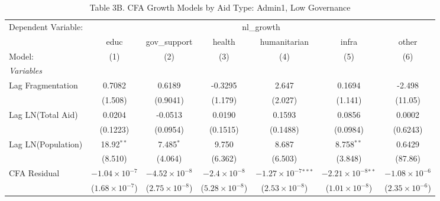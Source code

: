 \begin{table}[htbp]
   \caption{Table 3B. CFA Growth Models by Aid Type: Admin1, Low Governance}
   \centering
   \begin{tabular}{lcccccc}
      \tabularnewline \midrule \midrule
      Dependent Variable: & \multicolumn{6}{c}{nl\_growth}\\
                         & educ                    & gov\_support            & health                  & humanitarian                   & infra                         & other \\   
      Model:             & (1)                     & (2)                     & (3)                     & (4)                            & (5)                           & (6)\\  
      \midrule
      \emph{Variables}\\
      Lag Fragmentation  & 0.7082                  & 0.6189                  & -0.3295                 & 2.647                          & 0.1694                        & -2.498\\   
                         & (1.508)                 & (0.9041)                & (1.179)                 & (2.027)                        & (1.141)                       & (11.05)\\   
      Lag LN(Total Aid)  & 0.0204                  & -0.0513                 & 0.0190                  & 0.1593                         & 0.0856                        & 0.0002\\   
                         & (0.1223)                & (0.0954)                & (0.1515)                & (0.1488)                       & (0.0984)                      & (0.6243)\\   
      Lag LN(Population) & 18.92$^{**}$            & 7.485$^{*}$             & 9.750                   & 8.687                          & 8.758$^{**}$                  & 0.6429\\   
                         & (8.510)                 & (4.064)                 & (6.362)                 & (6.503)                        & (3.848)                       & (87.86)\\   
      CFA Residual       & $-1.04\times 10^{-7}$   & $-4.52\times 10^{-8}$   & $-2.4\times 10^{-8}$    & $-1.27\times 10^{-7}$$^{***}$  & $-2.21\times 10^{-8}$$^{**}$  & $-1.08\times 10^{-6}$\\    
                         & ($1.68\times 10^{-7}$)  & ($2.75\times 10^{-8}$)  & ($5.28\times 10^{-8}$)  & ($2.53\times 10^{-8}$)         & ($1.01\times 10^{-8}$)        & ($2.35\times 10^{-6}$)\\    

\end{tabular}
\end{table}
